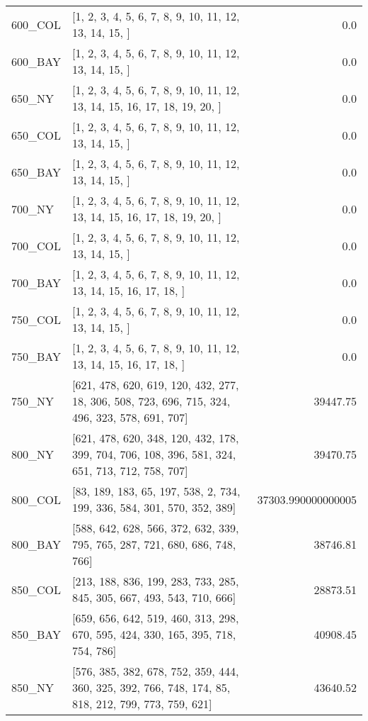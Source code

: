 \documentclass[main.tex]{subfiles}
\begin{document}
\begin{center}
\begin{tabular}{llr}
600\_COL & [1, 2, 3, 4, 5, 6, 7, 8, 9, 10, 11, 12, 13, 14, 15, ] & 0.0\\
600\_BAY & [1, 2, 3, 4, 5, 6, 7, 8, 9, 10, 11, 12, 13, 14, 15, ] & 0.0\\
650\_NY & [1, 2, 3, 4, 5, 6, 7, 8, 9, 10, 11, 12, 13, 14, 15, 16, 17, 18, 19, 20, ] & 0.0\\
650\_COL & [1, 2, 3, 4, 5, 6, 7, 8, 9, 10, 11, 12, 13, 14, 15, ] & 0.0\\
650\_BAY & [1, 2, 3, 4, 5, 6, 7, 8, 9, 10, 11, 12, 13, 14, 15, ] & 0.0\\
700\_NY & [1, 2, 3, 4, 5, 6, 7, 8, 9, 10, 11, 12, 13, 14, 15, 16, 17, 18, 19, 20, ] & 0.0\\
700\_COL & [1, 2, 3, 4, 5, 6, 7, 8, 9, 10, 11, 12, 13, 14, 15, ] & 0.0\\
700\_BAY & [1, 2, 3, 4, 5, 6, 7, 8, 9, 10, 11, 12, 13, 14, 15, 16, 17, 18, ] & 0.0\\
750\_COL & [1, 2, 3, 4, 5, 6, 7, 8, 9, 10, 11, 12, 13, 14, 15, ] & 0.0\\
750\_BAY & [1, 2, 3, 4, 5, 6, 7, 8, 9, 10, 11, 12, 13, 14, 15, 16, 17, 18, ] & 0.0\\
750\_NY & [621, 478, 620, 619, 120, 432, 277, 18, 306, 508, 723, 696, 715, 324, 496, 323, 578, 691, 707] & 39447.75\\
800\_NY & [621, 478, 620, 348, 120, 432, 178, 399, 704, 706, 108, 396, 581, 324, 651, 713, 712, 758, 707] & 39470.75\\
800\_COL & [83, 189, 183, 65, 197, 538, 2, 734, 199, 336, 584, 301, 570, 352, 389] & 37303.990000000005\\
800\_BAY & [588, 642, 628, 566, 372, 632, 339, 795, 765, 287, 721, 680, 686, 748, 766] & 38746.81\\
850\_COL & [213, 188, 836, 199, 283, 733, 285, 845, 305, 667, 493, 543, 710, 666] & 28873.51\\
850\_BAY & [659, 656, 642, 519, 460, 313, 298, 670, 595, 424, 330, 165, 395, 718, 754, 786] & 40908.45\\
850\_NY & [576, 385, 382, 678, 752, 359, 444, 360, 325, 392, 766, 748, 174, 85, 818, 212, 799, 773, 759, 621] & 43640.52\\
\hline\end{tabular}
\end{center}
\newpage
\end{document}
